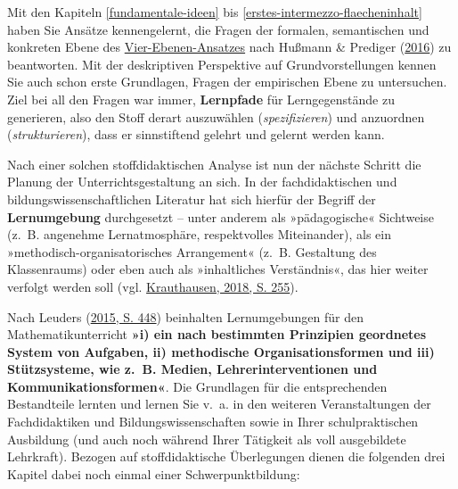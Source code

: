\documentclass[
]{scrbook}
\theoremstyle{definition}
\theoremstyle{definition}
\theoremstyle{definition}
\theoremstyle{definition}
\theoremstyle{remark}
\begin{document}
Mit den Kapiteln \ref{fundamentale-ideen} bis \ref{erstes-intermezzo-flaecheninhalt} haben Sie Ansätze kennengelernt, die Fragen der \textcolor{formalColor}{formalen}, \textcolor{semanticColor}{semantischen} und \textcolor{concreteColor}{konkreten} Ebene des \protect\hyperlink{tab:fragen-ebenen}{Vier-Ebenen-Ansatzes} nach Hußmann \& Prediger (\protect\hyperlink{ref-Hussmann:2016}{2016}) zu beantworten. Mit der deskriptiven Perspektive auf Grundvorstellungen kennen Sie auch schon erste Grundlagen, Fragen der \textcolor{empiricColor}{empirischen} Ebene zu untersuchen. Ziel bei all den Fragen war immer, \textbf{Lernpfade} für Lerngegenstände zu generieren, also den Stoff derart auszuwählen (\emph{spezifizieren}) und anzuordnen (\emph{strukturieren}), dass er sinnstiftend gelehrt und gelernt werden kann.

Nach einer solchen stoffdidaktischen Analyse ist nun der nächste Schritt die Planung der Unterrichtsgestaltung an sich. In der fachdidaktischen und bildungswissenschaftlichen Literatur hat sich hierfür der Begriff der \textbf{Lernumgebung} durchgesetzt -- unter anderem als »pädagogische« Sichtweise (z.~B. angenehme Lernatmosphäre, respektvolles Miteinander), als ein »methodisch-organisatorisches Arrangement« (z.~B. Gestaltung des Klassenraums) oder eben auch als »inhaltliches Verständnis«, das hier weiter verfolgt werden soll (vgl. \protect\hyperlink{ref-Krauthausen:2018}{Krauthausen, 2018, S. 255}).

Nach Leuders (\protect\hyperlink{ref-Leuders2015}{2015, S. 448}) beinhalten Lernumgebungen für den Mathematikunterricht \textbf{»i) ein nach bestimmten Prinzipien geordnetes System von Aufgaben, ii) methodische Organisationsformen und iii) Stützsysteme, wie z.~B. Medien, Lehrerinterventionen und Kommunikationsformen«}. Die Grundlagen für die entsprechenden Bestandteile lernten und lernen Sie v.~a. in den weiteren Veranstaltungen der Fachdidaktiken und Bildungswissenschaften sowie in Ihrer schulpraktischen Ausbildung (und auch noch während Ihrer Tätigkeit als voll ausgebildete Lehrkraft). Bezogen auf stoffdidaktische Überlegungen dienen die folgenden drei Kapitel dabei noch einmal einer Schwerpunktbildung:
\end{document}

